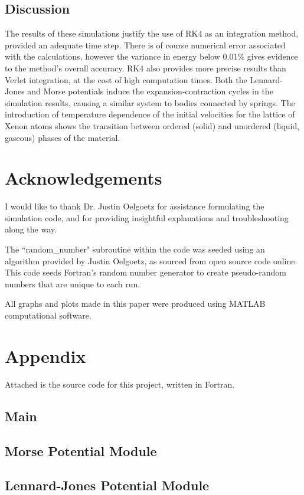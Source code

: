 \documentclass[12pt]{article}
\begin{document}
\subsection*{Discussion}
The results of these simulations justify the use of RK4 as an integration method, provided an adequate time step.  There is of course numerical error associated with the calculations, however the variance in energy below 0.01\% gives evidence to the method's overall accuracy.  RK4 also provides more precise results than Verlet integration, at the cost of high computation times. \autocite{me}  Both the Lennard-Jones and Morse potentials induce the expansion-contraction cycles in the simulation results, causing a similar system to bodies connected by springs. \autocite{mpotential,ljpotential} The introduction of temperature dependence of the initial velocities for the lattice of Xenon atoms shows the transition between ordered (solid) and unordered (liquid, gaseous) phases of the material.
\newpage
\section*{Acknowledgements}
I would like to thank Dr. Justin Oelgoetz for assistance formulating the simulation code, and for providing insightful explanations and troubleshooting along the way.

The ``random\_number" subroutine within the code was seeded using an algorithm provided by Justin Oelgoetz, as sourced from open source code online.  This code seeds Fortran's random number generator to create pseudo-random numbers that are unique to each run.

All graphs and plots made in this paper were produced using MATLAB computational software.
\newpage

\printbibliography
\newpage
\section*{Appendix}
Attached is the source code for this project, written in Fortran.
\subsection*{Main}

\subsection*{Morse Potential Module}

\subsection*{Lennard-Jones Potential Module}

\end{document}
